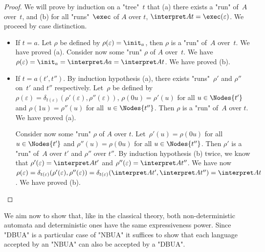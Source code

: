 \documentclass[twoside]{article}
\begin{document}
\begin{proof}
	We will prove by induction on a "tree"~$t$ that (a) there exists a "run" of~$A$ over~$t$, and (b) for all "runs"~$\exec$ of $A$ over $t$, $\interpret A t = \exec (\varepsilon)$.
	We proceed by case distinction.
	\begin{itemize}
		\item If $t = a$. Let $\rho$ be defined by $\rho(\varepsilon)=\init_a$, then $\rho$ is a "run" of~$A$ over~$t$. We have proved (a).
		      Consider now some "run" $\rho$ of $A$ over~$t$. We have $\rho(\varepsilon)=\init_a=\interpret A a=\interpret A t$. We have proved  (b).

		\item If $t = a(t',t'')$. By induction hypothesis (a), there exists "runs"~$\rho'$ and $\rho''$ on~$t'$ and $t''$ respectively.
		      Let~$\rho$ be defined by $\rho(\varepsilon)=\delta_{t(\varepsilon)}(\rho'(\varepsilon),\rho''(\varepsilon))$,
		      $\rho(0u)=\rho'(u)$ for all $u\in\Nodes{t'}$ and $\rho(1u)=\rho''(u)$ for all~$u\in \Nodes{t''}$. Then $\rho$ is a "run" of~$A$ over $t$. We have proved (a).

		      Consider now some "run" $\rho$ of $A$ over $t$. Let~$\rho'(u)=\rho(0u)$ for all $u \in \Nodes {t'}$ and $\rho''(u)=\rho(0u)$ for all $u \in \Nodes {t''}$.
		      Then $\rho'$ is a "run" of~$A$ over $t'$ and $\rho''$ over $t''$. By induction hypothesis (b) twice, we know that $\rho'(\varepsilon)=\interpret A {t'}$ and $\rho''(\varepsilon)=\interpret A {t''}$.
		      We have now $\rho(\varepsilon) = \delta_{t(\varepsilon)}(\rho'(\varepsilon),\rho''(\varepsilon)) = \delta_{t(\varepsilon)}(\interpret A {t'},\interpret A {t''}) = \interpret A t$. We have proved (b).
	\end{itemize}
\end{proof}


We aim now to show that, like in the classical theory, both non-deterministic automata and deterministic ones have the same expressiveness power.
Since "DBUA" is a particular case of "NBUA" it suffices to show that each language accepted by an "NBUA" can also be accepted by a "DBUA".
\end{document}

